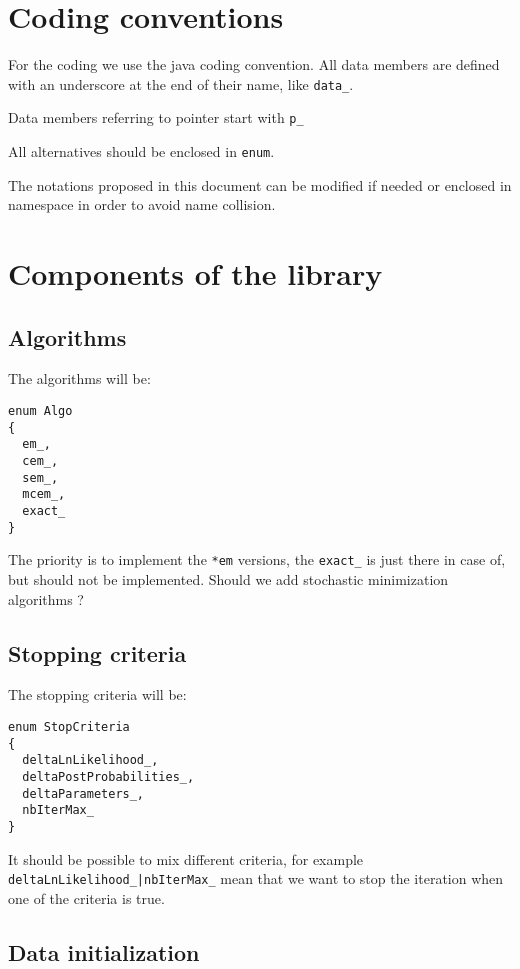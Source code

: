 \documentclass[iutinfo, cadre]{ens-ustl}
\begin{document}
\maketitle

\section{Coding conventions}

For the coding we use the java coding convention. All data members
are defined with an underscore at the end of their name, like \verb+data_+.

Data members referring to pointer start with \verb+p_+

All alternatives should be enclosed in \verb+enum+.

The notations proposed in this document can be modified if needed
or enclosed in namespace in order to avoid name collision.


\section{Components of the library}
\subsection{Algorithms}

The algorithms will be:
\begin{verbatim}
enum Algo
{
  em_,
  cem_,
  sem_,
  mcem_,
  exact_
}
\end{verbatim}

The priority is to implement the \verb+*em+ versions, the \verb+exact_+ is just there in case of, but
should not be implemented. Should we add stochastic minimization algorithms ?

\subsection{Stopping criteria}

The stopping criteria will be:
\begin{verbatim}
enum StopCriteria
{
  deltaLnLikelihood_,
  deltaPostProbabilities_,
  deltaParameters_,
  nbIterMax_
}
\end{verbatim}
It should be possible to mix different criteria, for example
\verb+deltaLnLikelihood_|nbIterMax_+ mean that we want to stop the iteration when one
of the criteria is true.

\subsection{Data initialization}
\end{document}
